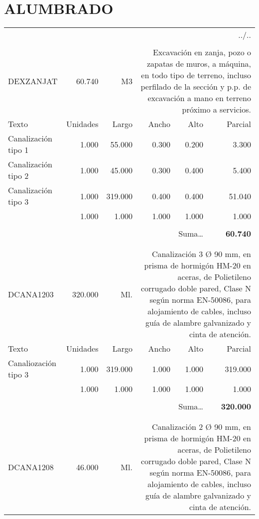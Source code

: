 \documentclass{book}%
\begin{document}
\section{ALUMBRADO}%
\label{sec:ALUMBRADO}%
\begin{longtable}{lrrrrr}%
\multicolumn{6}{r}{../..}\\%
\endfoot%
\endlastfoot%
&&&&&\\%
DEXZANJAT&60.740& M3&\multicolumn{3}{p{6cm}}{\scriptsize Excavación en zanja, pozo o zapatas de muros, a máquina, en todo tipo de terreno, incluso perfilado de la sección y p.p. de excavación a mano en terreno próximo a servicios.\normalsize}\\%
Texto&Unidades&Largo&Ancho&Alto&Parcial\\%
\hline%
\multicolumn{1}{p{3.5cm}}{Canalización tipo 1}&1.000&55.000&0.300&0.200&3.300\\%
\multicolumn{1}{p{3.5cm}}{Canalización tipo 2}&1.000&45.000&0.300&0.400&5.400\\%
\multicolumn{1}{p{3.5cm}}{Canalización tipo 3}&1.000&319.000&0.400&0.400&51.040\\%
\multicolumn{1}{p{3.5cm}}{}&1.000&1.000&1.000&1.000&1.000\\%
&&&&&\\%
\multicolumn{5}{r}{Suma\ldots}&\textbf{60.740}\\%
\hline%
&&&&&\\%
&&&&&\\%
DCANA1203&320.000& Ml.&\multicolumn{3}{p{6cm}}{\scriptsize Canalización 3 Ø 90 mm, en prisma de hormigón HM-20 en aceras, de Polietileno corrugado doble pared, Clase N según norma EN-50086, para alojamiento de cables, incluso guía de alambre galvanizado y cinta de atención.\normalsize}\\%
Texto&Unidades&Largo&Ancho&Alto&Parcial\\%
\hline%
\multicolumn{1}{p{3.5cm}}{Canaliozación tipo 3}&1.000&319.000&1.000&1.000&319.000\\%
\multicolumn{1}{p{3.5cm}}{}&1.000&1.000&1.000&1.000&1.000\\%
&&&&&\\%
\multicolumn{5}{r}{Suma\ldots}&\textbf{320.000}\\%
\hline%
&&&&&\\%
&&&&&\\%
DCANA1208&46.000& Ml.&\multicolumn{3}{p{6cm}}{\scriptsize Canalización 2 Ø 90 mm, en prisma de hormigón HM-20 en aceras, de Polietileno corrugado doble pared, Clase N según norma EN-50086, para alojamiento de cables, incluso guía de alambre galvanizado y cinta de atención.\normalsize}\\%

\end{longtable}
\end{document}
